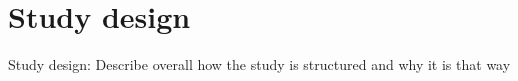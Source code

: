 \section{Study design}
Study design: Describe overall how the study is structured and why it is that way
